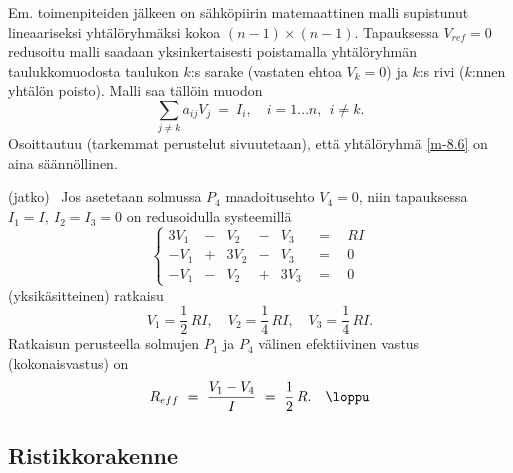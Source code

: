 Em. toimenpiteiden jälkeen on sähköpiirin matemaattinen malli supistunut lineaariseksi 
yhtälöryhmäksi kokoa $(n-1) \times (n-1)$. Tapauksessa $V_{ref} = 0$ redusoitu malli saadaan
yksinkertaisesti poistamalla yhtälöryhmän taulukkomuodosta taulukon $k$:s sarake
(vastaten ehtoa $V_k = 0$) ja $k$:s rivi ($k$:nnen yhtälön poisto). Malli saa tällöin muodon 
\begin{equation} \label{m-8.6}
\sum_{j \neq k} a_{ij} V_j\ =\ I_i, \quad i = 1 \ldots n,\ \ i \neq k.
\end{equation}
Osoittautuu (tarkemmat perustelut sivuutetaan), että yhtälöryhmä \eqref{m-8.6} on aina 
säännöllinen.
\jatko \begin{Exa} (jatko) \ Jos asetetaan solmussa $P_4$ maadoitusehto $V_4 = 0$, niin 
tapauksessa $I_1 = I,\ I_2 = I_3 = 0$ on redusoidulla systeemillä
\[ \left\{ \begin{array}{rrrrrrl}  3V_1&-& V_2&-& V_3&\ \ =\ \ &RI\\
                                  -V_1&+&3V_2&-& V_3&\ \ =\ \ & 0\\
                                  -V_1&-& V_2&+&3V_3&\ \ =\ \ &0
\end{array} \right. \] 
(yksikäsitteinen) ratkaisu
\[
V_1 = \frac{1}{2}\,RI, \quad V_2 = \frac{1}{4}\,RI, \quad V_3 = \frac{1}{4}\,RI.
\]
Ratkaisun perusteella solmujen $P_1$ ja $P_4$ välinen efektiivinen vastus (kokonaisvastus) on
\[
R_{eff}\ =\ \frac{V_1 - V_4}{I}\ =\ \frac{1}{2}\,R. \quad \loppu
\] \end{Exa}

\subsection{Ristikkorakenne}

